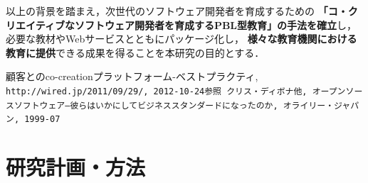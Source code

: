 \documentclass[11pt,a4paper,twoside]{jarticle}
\newcommand{\研究種別}{B}	%
\newcommand{\研究課題名}{コ・クリエイティブなソフトウェア開発者を育成するPBL型教育}
\newcommand{\研究機関名}{産業技術大学院大学}
\newcommand{\研究代表者氏名}{中鉢　欣秀}
\newcommand{\研究代表者氏名ふりがな}{ちゅうばち　よしひで}
\newcommand{\本応募effort}{\KLEffort{18}}	%
\newcommand{\研究期間の最終元号年度}{27}	%
\begin{document}
{    以上の背景を踏まえ，次世代のソフトウェア開発者を育成するための
    {\bf 「コ・クリエイティブなソフトウェア開発者を育成するPBL型教育」の手法を確立}し，必要な教材やWebサービスとともにパッケージ化し，
    {\bf 様々な教育機関における教育に提供}できる成果を得ることを本研究の目的とする．
    
	\vspace{1cm}
	\begin{thebibliography}{99}
		 顧客とのco-creationプラットフォーム-ベストプラクティ, \\
                        \tt{http://wired.jp/2011/09/29/},  2012-10-24参照
         クリス・ディボナ他, オープンソースソフトウェア―彼らはいかにしてビジネススタンダードになったのか,
        				オライリー・ジャパン, 1999-07
	\end{thebibliography}
}

\section{研究計画・方法}
\newcommand{\研究計画と方法概要}{%
	コ・クリエイティブなソフトウェア技術者を育成するために，本研究ではPBLでの利用を前提とした
	教材開発を行う．この教材開発プロセスはアジャイル型で実施する．
	すなわち，計画期間内においてアジャイル（迅速）に教材の開発と適用を繰り返し，より教育効果の高い
	成果を得る．
	
	また，迅速な電子教材開発のための「アジャイル電子教材製作スタジオ」を用意することで．
	コンテンツとして用いる動画や音声を素早く迅速に
	製作できるようにする．作製した電子教材は，学生や教員がPBL実施時にオン・デマンドで参照できるようにし，
	学生の自発的な学びを支援する．

	初年度はScrum型の開発プロセスの教材を作成し，以降，コ・クリエイティブなソフトウェア開発のために
	必要な内容を拡充させる．成果物は本学および他大学でのPBLにおいて複数回利用し，改善を繰り返す．
	また，電子教材はクラウド型のサービスを用いて利用者に
	広く提供するものとする．
}
\end{document}
